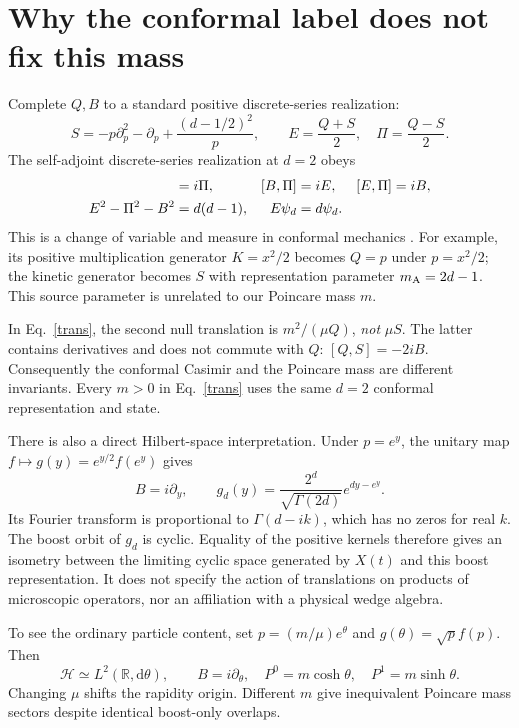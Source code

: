 \documentclass[11pt,a4paper]{article}
\newcommand{\dd}{\mathrm d}
\begin{document}
\newpage
\section{Why the conformal label does not fix this mass}
Complete $Q,B$ to a standard positive discrete-series realization:
\begin{equation}
 S=-p\partial_p^2-\partial_p+\frac{(d-1/2)^2}{p},\qquad
 E=\frac{Q+S}{2},\quad\Pi=\frac{Q-S}{2}.\label{slrep}
\end{equation}
The self-adjoint discrete-series realization at $d=2$ obeys
\begin{align}
 [B,E]&=i\Pi,&[B,\Pi]&=iE,&[E,\Pi]&=iB,\notag\\
 E^2-\Pi^2-B^2&=d(d-1),&E\psi_d&=d\psi_d.\label{sl}
\end{align}
This is a change of variable and measure in conformal mechanics
\cite{andrzejewski}. For example, its positive multiplication generator
$K=x^2/2$ becomes $Q=p$ under $p=x^2/2$; the kinetic generator becomes
$S$ with representation parameter $m_{\rm A}=2d-1$. This source parameter
is unrelated to our Poincare mass $m$.

In Eq.~\eqref{trans}, the second null translation is $m^2/(\mu Q)$,
\emph{not} $\mu S$. The latter contains derivatives and does not commute
with $Q$: $[Q,S]=-2iB$. Consequently the conformal Casimir and the
Poincare mass are different invariants. Every $m>0$ in
Eq.~\eqref{trans} uses the same $d=2$ conformal representation and state.

There is also a direct Hilbert-space interpretation. Under $p=e^y$,
the unitary map $f\mapsto g(y)=e^{y/2}f(e^y)$ gives
\begin{equation}
 B=i\partial_y,\qquad g_d(y)=\frac{2^d}{\sqrt{\Gamma(2d)}}e^{dy-e^y}.
\end{equation}
Its Fourier transform is proportional to $\Gamma(d-ik)$, which has no
zeros for real $k$. The boost orbit of $g_d$ is cyclic. Equality of the
positive kernels therefore gives an isometry between the limiting
cyclic space generated by $X(t)$ and this boost representation. It does
not specify the action of translations on products of microscopic
operators, nor an affiliation with a physical wedge algebra.

To see the ordinary particle content, set $p=(m/\mu)e^\theta$ and
$g(\theta)=\sqrt p f(p)$. Then
\begin{equation}
 \mathcal H\simeq L^2(\mathbb R,\dd\theta),\qquad
 B=i\partial_\theta,\quad P^0=m\cosh\theta,\quad P^1=m\sinh\theta.
\end{equation}
Changing $\mu$ shifts the rapidity origin. Different $m$ give inequivalent
Poincare mass sectors despite identical boost-only overlaps.
\end{document}
